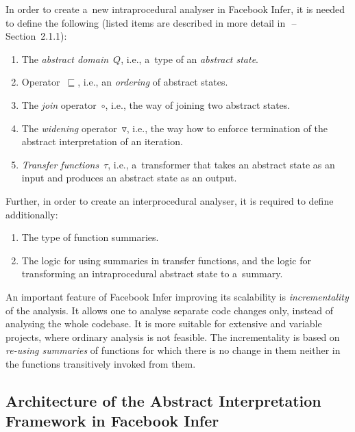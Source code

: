 In order to create a~new intraprocedural analyser in Facebook Infer,
it is needed to define the following (listed items are described in more detail
in~\cite{harmimBP}\,--\,Section~2.1.1):
\begin{enumerate}
    \item
        The \emph{abstract domain}~$ Q $, i.e., a~type of an \emph{abstract
        state}.

    \item
        Operator~$ \sqsubseteq $, i.e., an \emph{ordering} of abstract states.

    \item
        The \emph{join} operator~$ \circ $, i.e., the way of joining two
        abstract states.

    \item
        The \emph{widening} operator~$ \triangledown $, i.e., the way how to
        enforce termination of the abstract interpretation of an iteration.

    \item
        \emph{Transfer functions}~$ \tau $, i.e., a~transformer that takes an
        abstract state as an input and produces an abstract state as an output.
\end{enumerate}
Further, in order to create an interprocedural analyser, it is required to
define additionally:
\begin{enumerate}
    \item
        The type of function summaries.

    \item
        The logic for using summaries in transfer functions, and the logic for
        transforming an intraprocedural abstract state to a~summary.
\end{enumerate}

An important feature of Facebook Infer improving its scalability is
\emph{incrementality} of the analysis. It allows one to analyse separate code
changes only, instead of analysing the whole codebase. It is more suitable for
extensive and variable projects, where ordinary analysis is not feasible. The
incrementality is based on \emph{re-using summaries} of functions for which
there is no change in them neither in the functions transitively invoked from
them.

\subsection{\sloppy%
    Architecture of the Abstract Interpretation Framework in Facebook Infer%
}
\label{sec:fbinferArch}

